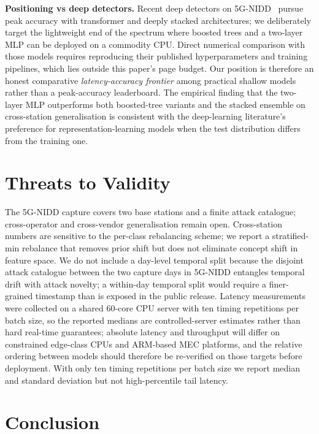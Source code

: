 \documentclass[conference]{IEEEtran}
\begin{document}
\textbf{Positioning vs deep detectors.}
Recent deep detectors on 5G-NIDD~\cite{harshdeep2025_deeptransids,enids_2024,
ilias2025_cnn_moe} pursue peak accuracy with transformer and
deeply stacked architectures; we deliberately target the lightweight
end of the spectrum where boosted trees and a two-layer MLP can be
deployed on a commodity CPU. Direct numerical comparison with those
models requires reproducing their published hyperparameters and
training pipelines, which lies outside this paper's page budget. Our
position is therefore an honest comparative \emph{latency-accuracy
frontier} among practical shallow models rather than a peak-accuracy
leaderboard. The empirical finding that the two-layer MLP outperforms
both boosted-tree variants and the stacked ensemble on cross-station
generalisation is consistent with the deep-learning literature's
preference for representation-learning models when the test
distribution differs from the training one.

\section{Threats to Validity}
\label{sec:threats}

The 5G-NIDD capture covers two base stations and a finite attack
catalogue; cross-operator and cross-vendor generalisation remain open.
Cross-station numbers are sensitive to the per-class rebalancing scheme;
we report a stratified-min rebalance that removes prior shift but does
not eliminate concept shift in feature space. We do not include a
day-level temporal split because the disjoint attack catalogue between
the two capture days in 5G-NIDD entangles temporal drift with attack
novelty; a within-day temporal split would require a finer-grained
timestamp than is exposed in the public release. Latency measurements were collected on a shared 60-core CPU server
with ten timing repetitions per batch size, so the reported medians
are controlled-server estimates rather than hard real-time guarantees;
absolute latency and throughput will differ on constrained edge-class
CPUs and ARM-based MEC platforms, and the relative ordering between
models should therefore be re-verified on those targets before
deployment. With only ten timing repetitions per batch size we report
median and standard deviation but not high-percentile tail latency.

\section{Conclusion}
\label{sec:conclusion}
\end{document}
